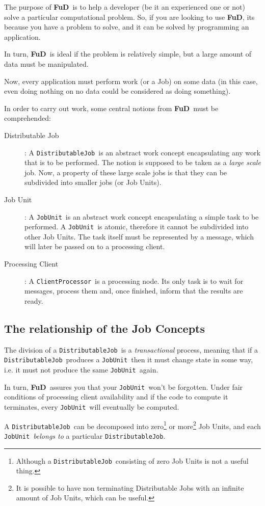 \documentclass[a4paper,12pt,english]{article}
\newcommand{\fud}{\textbf{FuD}}
\renewcommand{\DJ}{\texttt{DistributableJob}}
\newcommand{\JU}{\texttt{JobUnit}}
\newcommand{\CP}{\texttt{ClientProcessor}}
\begin{document}
The purpose of \fud \ is to help a developer (be it an experienced one or not) solve a particular computational problem. So, if you are looking to use \fud, its because you have a problem to solve, and it can be solved by programming an application.

In turn, \fud \ is ideal if the problem is relatively simple, but a large amount of data must be manipulated.

Now, every application must perform work (or a Job) on some data (in this case, even doing nothing on no data could be considered as doing something).

In order to carry out work, some central notions from \fud \ must be comprehended:
\begin{description}
\item[Distributable Job]: A \DJ \ is an abstract work concept encapsulating any work that is to be performed. The notion is supposed to be taken as a \emph{large scale} job. Now, a property of these large scale jobs is that they can be subdivided into smaller jobs (or Job Units).
\item[Job Unit]: A \JU \ is an abstract work concept encapsulating a simple task to be performed. A \JU \ is atomic, therefore it cannot be subdivided into other Job Units. The task itself must be represented by a message, which will later be passed on to a processing client.
\item[Processing Client]: A \CP \ is a processing node. Its only task is to wait for messages, process them and, once finished, inform that the results are ready.
\end{description}

\subsection{The relationship of the Job Concepts}

The division of a \DJ \ is a \emph{transactional} process, meaning that if a \DJ \ produces a \JU \ then it must change state in some way, i.e. it must not produce the same \JU \ again.

In turn, \fud \ assures you that your \JU \ won't be forgotten. Under fair conditions of processing client availability and if the code to compute it terminates, every \JU \ will eventually be computed.

A \DJ \ can be decomposed into zero\footnote{Although a \DJ \ consisting of zero Job Units is not a useful thing.} or more\footnote{It is possible to have non terminating Distributable Jobs with an infinite amount of Job Units, which can be useful.} Job Units, and each \JU \ \emph{belongs to} a particular \DJ.
\end{document}
